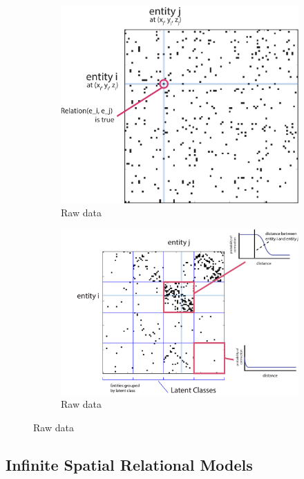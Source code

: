 \documentclass{article}
\begin{document}
\begin{figure}
  \centering 
  \begin{subfigure}[b]{0.4\textwidth}
    \includegraphics[width=\textwidth]{f1.raw.pdf}
    \caption{Raw data}
    \label{fig:gull}
  \end{subfigure}
  \begin{subfigure}[b]{0.55\textwidth}
    \includegraphics[width=\textwidth]{f1.sorted.pdf}
    \caption{Raw data}
    \label{fig:gull}
  \end{subfigure}
\end{figure}

\subsection{Infinite Spatial Relational Models}
\end{document}
